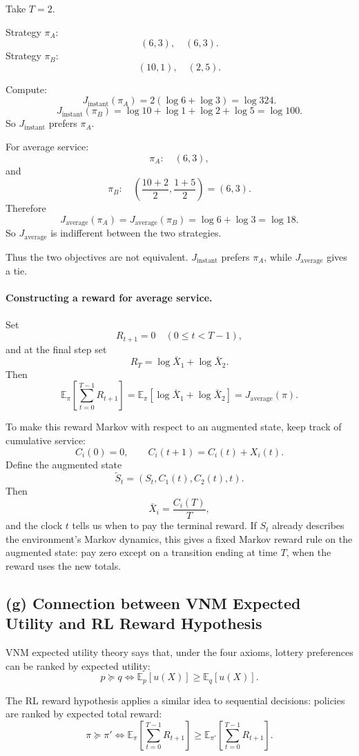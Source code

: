 \documentclass[11pt,a4paper]{article}
\begin{document}
Take \(T=2\).

Strategy \(\pi_A\):
\[
(6,3),\quad (6,3).
\]
Strategy \(\pi_B\):
\[
(10,1),\quad (2,5).
\]

Compute:
\[
J_{\mathrm{instant}}(\pi_A)
=
2(\log 6+\log 3)
=
\log 324.
\]
\[
J_{\mathrm{instant}}(\pi_B)
=
\log 10+\log 1+\log 2+\log 5
=
\log 100.
\]
So \(J_{\mathrm{instant}}\) prefers \(\pi_A\).

For average service:
\[
\pi_A:\quad (6,3),
\]
and
\[
\pi_B:\quad
\left(\frac{10+2}{2},\frac{1+5}{2}\right)
=
(6,3).
\]
Therefore
\[
J_{\mathrm{average}}(\pi_A)
=
J_{\mathrm{average}}(\pi_B)
=
\log 6+\log 3
=
\log 18.
\]
So \(J_{\mathrm{average}}\) is indifferent between the two strategies.

Thus the two objectives are not equivalent. \(J_{\mathrm{instant}}\) prefers
\(\pi_A\), while \(J_{\mathrm{average}}\) gives a tie.


\paragraph{Constructing a reward for average service.}
Set
\[
R_{t+1}=0\quad(0\le t<T-1),
\]
and at the final step set
\[
R_T=\log \bar X_1+\log \bar X_2.
\]
Then
\[
\mathbb E_\pi\left[\sum_{t=0}^{T-1}R_{t+1}\right]
=
\mathbb E_\pi[\log \bar X_1+\log \bar X_2]
=
J_{\mathrm{average}}(\pi).
\]

To make this reward Markov with respect to an augmented state, keep track
of cumulative service:
\[
C_i(0)=0,\qquad C_i(t+1)=C_i(t)+X_i(t).
\]
Define the augmented state
\[
\tilde S_t=(S_t,C_1(t),C_2(t),t).
\]
Then
\[
\bar X_i=\frac{C_i(T)}{T},
\]
and the clock \(t\) tells us when to pay the terminal reward. If \(S_t\)
already describes the environment's Markov dynamics, this gives a fixed
Markov reward rule on the augmented state: pay zero except on a transition
ending at time \(T\), when the reward uses the new totals.

\subsection*{(g) Connection between VNM Expected Utility and RL Reward Hypothesis}

VNM expected utility theory says that, under the four axioms, lottery
preferences can be ranked by expected utility:
\[
p\succeq q
\iff
\mathbb E_p[u(X)]\ge \mathbb E_q[u(X)].
\]

The RL reward hypothesis applies a similar idea to sequential decisions:
policies are ranked by expected total reward:
\[
\pi\succeq \pi'
\iff
\mathbb E_\pi\left[\sum_{t=0}^{T-1}R_{t+1}\right]
\ge
\mathbb E_{\pi'}\left[\sum_{t=0}^{T-1}R_{t+1}\right].
\]
\end{document}
